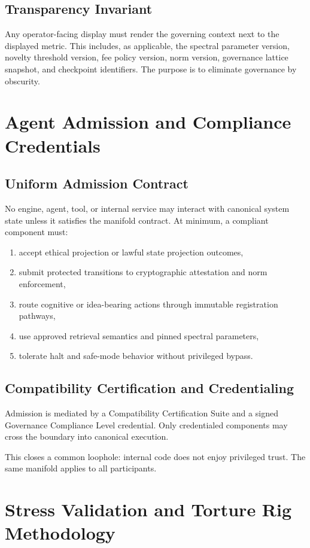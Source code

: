 \documentclass[11pt]{article}
\begin{document}
\subsection{Transparency Invariant}
Any operator-facing display must render the governing context next to the displayed metric. This includes, as applicable, the spectral parameter version, novelty threshold version, fee policy version, norm version, governance lattice snapshot, and checkpoint identifiers. The purpose is to eliminate governance by obscurity.

\section{Agent Admission and Compliance Credentials}
\subsection{Uniform Admission Contract}
No engine, agent, tool, or internal service may interact with canonical system state unless it satisfies the manifold contract. At minimum, a compliant component must:
\begin{enumerate}[leftmargin=1.3cm]
  \item accept ethical projection or lawful state projection outcomes,
  \item submit protected transitions to cryptographic attestation and norm enforcement,
  \item route cognitive or idea-bearing actions through immutable registration pathways,
  \item use approved retrieval semantics and pinned spectral parameters,
  \item tolerate halt and safe-mode behavior without privileged bypass.
\end{enumerate}

\subsection{Compatibility Certification and Credentialing}
Admission is mediated by a Compatibility Certification Suite and a signed Governance Compliance Level credential. Only credentialed components may cross the boundary into canonical execution.

This closes a common loophole: internal code does not enjoy privileged trust. The same manifold applies to all participants.

\section{Stress Validation and Torture Rig Methodology}
\end{document}
